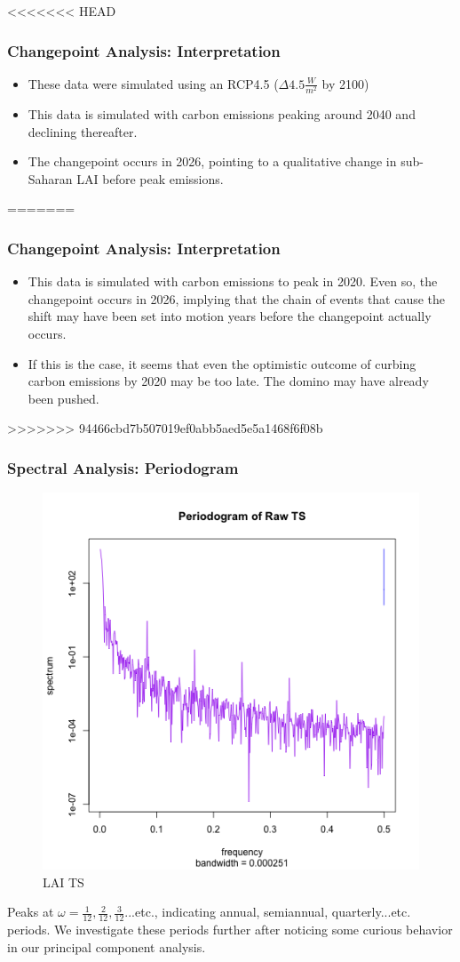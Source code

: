 \documentclass{beamer}
\begin{document}
\begin{frame}
<<<<<<< HEAD
	\frametitle{Changepoint Analysis: Interpretation}
	\begin{itemize}
            \item These data were simulated using an RCP4.5
                ($\Delta 4.5 \frac{W}{m^2}$ by 2100)
		\item This data is simulated with carbon emissions peaking
                    around 2040 and declining thereafter.
                \item The changepoint occurs in 2026, pointing to a qualitative
                    change in sub-Saharan LAI before peak emissions.
	\end{itemize}
=======
\frametitle{Changepoint Analysis: Interpretation}
\begin{itemize}
\item This data is simulated with carbon emissions to peak in 2020. Even so, the changepoint occurs in 2026, implying that the chain of events that cause the shift may have been set into motion years before the changepoint actually occurs.
\item If this is the case, it seems that even the optimistic outcome of curbing carbon emissions by 2020 may be too late. The domino may have already been pushed.
\end{itemize}
>>>>>>> 94466cbd7b507019ef0abb5aed5e5a1468f6f08b
\end{frame}


\begin{frame}
\frametitle{Spectral Analysis: Periodogram}
\begin{figure}
\centering
\includegraphics[width=0.5\linewidth]{../img/RawSpec_LAI.png}
\caption{LAI TS}
\end{figure}
Peaks at $\omega=\frac{1}{12},\frac{2}{12}, \frac{3}{12}...$etc., indicating annual, semiannual, quarterly...etc. periods. We investigate these periods further after noticing some curious behavior in our principal component analysis.
\end{frame}
\end{document}
